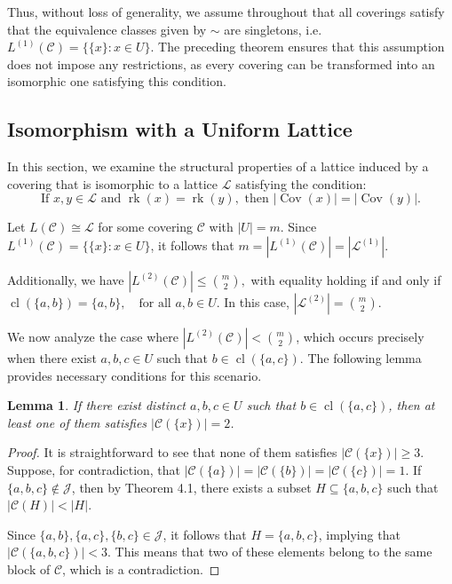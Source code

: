 \documentclass{article}
\newtheorem{lemma}[theorem]{Lemma}
\begin{document}
Thus, without loss of generality, we assume throughout that all coverings satisfy that the equivalence classes given by $\sim$ are singletons, i.e. \( L^{(1)}(\mathcal{C}) = \{\{x\} : x \in U\} \). The preceding theorem ensures that this assumption does not impose any restrictions, as every covering can be transformed into an isomorphic one satisfying this condition.

    \subsection{Isomorphism with a Uniform Lattice}

In this section, we examine the structural properties of a lattice induced by a covering that is isomorphic to a lattice \(\mathcal{L}\) satisfying the condition:
\[
\text{If } x, y \in \mathcal{L} \text{ and } \operatorname{rk}(x) = \operatorname{rk}(y), \text{ then } |\operatorname{Cov}(x)| = |\operatorname{Cov}(y)|. \tag{uniformity}
\]

Let \( L(\mathcal{C}) \cong \mathcal{L} \) for some covering \( \mathcal{C} \) with \( |U| = m \). Since \( L^{(1)}(\mathcal{C}) = \{\{x\} : x \in U\} \), it follows that $
m = |L^{(1)}(\mathcal{C})| = |\mathcal{L}^{(1)}|.
$

Additionally, we have 
$
|L^{(2)}(\mathcal{C})| \leq \binom{m}{2},
$
with equality holding if and only if 
$
\operatorname{cl}(\{a,b\}) = \{a,b\}, \quad \text{for all } a, b \in U.
$
In this case, \( |\mathcal{L}^{(2)}| = \binom{m}{2} \).

We now analyze the case where \( |L^{(2)}(\mathcal{C})| < \binom{m}{2} \), which occurs precisely when there exist \( a, b, c \in U \) such that 
$
b \in \operatorname{cl}(\{a,c\}).
$
The following lemma provides necessary conditions for this scenario.

\begin{lemma}
If there exist distinct \( a, b, c \in U \) such that \( b \in \operatorname{cl}(\{a,c\}) \), then at least one of them satisfies \( |\mathcal{C}(\{x\})| = 2 \).
\end{lemma}

\begin{proof}
It is straightforward to see that none of them satisfies \( |\mathcal{C}(\{x\})| \geq 3 \). Suppose, for contradiction, that \( |\mathcal{C}(\{a\})| = |\mathcal{C}(\{b\})| = |\mathcal{C}(\{c\})| = 1 \). If \( \{a,b,c\} \not\in \mathcal{J} \), then by Theorem 4.1, there exists a subset \( H \subseteq \{a,b,c\} \) such that \( |\mathcal{C}(H)| < |H| \). 

    Since \( \{a,b\}, \{a,c\}, \{b,c\} \in \mathcal{J} \), it follows that \( H = \{a,b,c\} \), implying that \( |\mathcal{C}(\{a,b,c\})| < 3 \). This means that two of these elements belong to the same block of \( \mathcal{C} \), which is a contradiction.
\end{proof}
\end{document}
